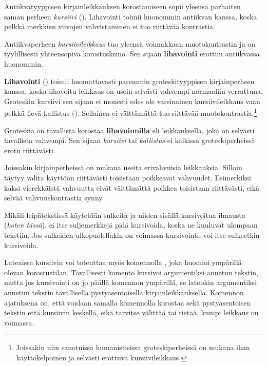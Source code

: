 Antiikvatyyppisen kirjainleikkauksen korostamiseen sopii yleensä
parhaiten saman perheen \textit{kursiivi} ().
Lihavointi toimii huonommin antiikvan kanssa, koska pelkkä merkkien
viivojen vahvistaminen ei tuo riittävää kontrastia.

\begin{tulossis}
  \rmfamily Antiikvaperheen \textit{kursiivileikkaus} tuo yleensä
  voimakkaan muotokontrastin ja on tyylillisesti yhteensopiva
  korostuskeino. Sen sijaan \textbf{lihavointi} erottuu antiikvassa
  huonommin.
\end{tulossis}

\noindent
\textbf{Lihavointi} () toimii huomattavasti paremmin
groteskityyppisen kirjainperheen kanssa, koska lihavoitu leikkaus on
usein selvästi vahvempi normaaliin verrattuna. Groteskin kursiivi sen
sijaan ei monesti edes ole varsinainen kursiivileikkaus vaan pelkkä
lievä kallistus (). Sellainen ei välttämättä tuo
riittävää muotokontrastia.\footnote{Joissakin niin sanotuissa
  humanistisissa groteskiperheissä on mukana ihan käyttökelpoinen ja
  selvästi erottuva kursiivileikkaus.}

\begin{tulossis}
  \sffamily Groteskia on tavallista korostaa \textbf{lihavoinnilla} eli
  leikkauksella, joka on selvästi tavallista vahvempi. Sen sijaan
  \textit{kursiivi} tai \textsl{kallistus} ei kaikissa groteskiperheissä
  erotu riittävästi.
\end{tulossis}

\noindent
Joissakin kirjainperheissä on mukana useita erivahvuisia leikkauksia.
Silloin täytyy valita käyttöön riittävästi toisistaan poikkeavat
vahvuudet. Esimerkiksi kaksi vierekkäistä vahvuutta eivät välttämättä
poikkea toisistaan riittävästi, eikä selvää vahvuuskontrastia synny.

Mikäli leipätekstissä käytetään sulkeita ja niiden sisällä kursivoitua
ilmausta (\textit{kuten tässä}), ei itse suljemerkkejä pidä kursivoida,
koska ne kuuluvat ulompaan tekstiin. Jos sulkeiden ulkopuolellakin on
voimassa kursivointi, voi itse sulkeetkin kursivoida.

Latexissa kursiivin voi toteuttaa myös komennolla , joka
huomioi ympärillä olevan korostustilan. Tavallisesti komento kursivoi
argumentiksi annetun tekstin, mutta jos kursivointi on jo päällä
komennon ympärillä, se latookin argumentiksi annetun tekstin
tavallisella pystyasentoisella kirjainleikkauksella. Komennon ajatuksena
on, että voidaan samalla komennolla korostaa sekä pystyasentoisen
tekstin että kursiivin keskellä, eikä tarvitse välittää tai tietää,
kumpi leikkaus on voimassa.

